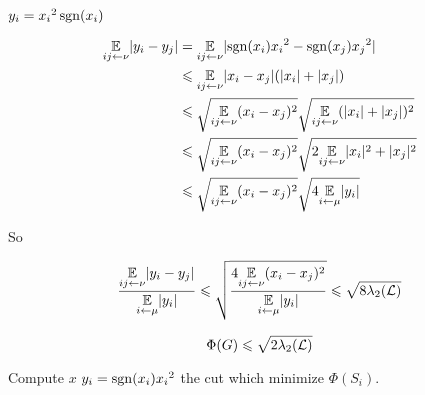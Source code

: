 $y_i = {x_i}^2 \operatorname{sgn}(x_i)$

\[
    \begin{aligned}
        \underset{ij\leftarrow\nu}{\mathbb{E}} \lvert y_i - y_j \rvert &= \underset{ij \leftarrow \nu}{\mathbb{E}} \lvert \operatorname{sgn}(x_i){x_i}^2 - \operatorname{sgn}(x_j){x_j}^2\rvert\\
        &\leqslant \underset{ij\leftarrow \nu}{\mathbb{E}} \lvert x_i-x_j \rvert(\lvert x_i \rvert + \lvert x_j \rvert)\\
        &\leqslant \sqrt{\underset{ij\leftarrow\nu}{\mathbb{E}}(x_i-x_j)^2} \sqrt{\underset{ij\leftarrow \nu}{\mathbb{E}} (\lvert x_i \rvert + \lvert x_j \rvert)^2}\\
        &\leqslant \sqrt{\underset{ij\leftarrow\nu}{\mathbb{E}}(x_i-x_j)^2} \sqrt{2\underset{ij\leftarrow \nu}{\mathbb{E}} \lvert x_i \rvert^2 + \lvert x_j \rvert^2}\\
        &\leqslant \sqrt{\underset{ij\leftarrow\nu}{\mathbb{E}}(x_i-x_j)^2} \sqrt{4\underset{i\leftarrow \mu}{\mathbb{E}} \lvert y_i \rvert}
    \end{aligned}
\]


So

\[
    \frac{\underset{ij\leftarrow\nu}{\mathbb{E}}\lvert y_i-y_j \rvert}{\underset{i\leftarrow\mu}{\mathbb{E}}\lvert y_i \rvert} \leqslant \sqrt{\frac{4 \underset{ij\leftarrow\nu}{\mathbb{E}}(x_i-x_j)^2}{\underset{i\leftarrow\mu}{\mathbb{E}}\lvert y_i \rvert}} \leqslant\sqrt{8\lambda_2(\mathcal{L})}
\]

\[
    \Phi(G) \leqslant \sqrt{2\lambda_2(\mathcal{L})}
\]

\begin{algorithm}[!ht]
    \DontPrintSemicolon
    Compute $x$\;
    $y_i = \operatorname{sgn}(x_i){x_i}^2$\;
    \Return the cut which minimize $\Phi(S_i)$.
\end{algorithm}

\FloatBarrier



